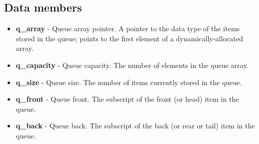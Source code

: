 \documentclass{report}
\begin{document}
    \bigbreak \noindent 
    \subsection{Data members}
    \begin{itemize}
        \item \textbf{q\_array} - Queue array pointer. A pointer to the data type of the items stored in the queue; points to the first element of a dynamically-allocated array.
        \item \textbf{q\_capacity} - Queue capacity. The number of elements in the queue array.
        \item \textbf{q\_size} - Queue size. The number of items currently stored in the queue.
        \item \textbf{q\_front} - Queue front. The subscript of the front (or head) item in the queue.
        \item \textbf{q\_back} - Queue back. The subscript of the back (or rear or tail) item in the queue.
    \end{itemize}
    \bigbreak \noindent 
\end{document}
